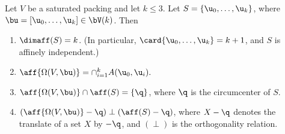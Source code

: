 \begin{lemma}[]\label{lemma:aff-center} 
Let $V$ be a saturated packing and let $k\le 3$.
Let $S = \{\u_0,\ldots,\u_k\}$, where $\bu=[\u_0,\ldots,\u_k]\in \bV(k)$.
Then
\begin{enumerate} 
\item $\dimaff (S)= k$.  
(In particular, $\card\{\u_0,\ldots,\u_k\}=k+1$, and
$S$ is affinely independent.)
\item $\aff{\Omega(V,\bu)}= \cap_{i=1}^k A(\u_0,\u_i).$
\item $\aff{\Omega(V,\bu)} \cap \aff(S) = \{\q\}$, 
where $\q$ is the circumcenter of $S$.
\item $(\aff{\Omega(V,\bu)}-\q) \perp (\aff(S)-\q)$, where
  $X-\q$ denotes the translate of a set $X$ by $-\q$, and $(\perp)$ is
  the orthogonality relation.
\end{enumerate}
\end{lemma}
%


